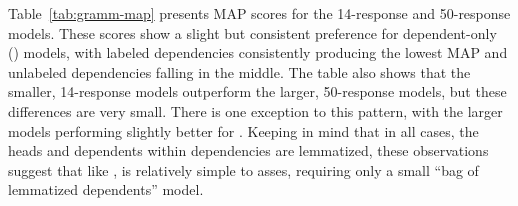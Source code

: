 Table~\ref{tab:gramm-map} presents  MAP scores for the 14-response and 50-response  models. These scores show a slight but consistent preference for dependent-only () models, with labeled dependencies consistently producing the lowest MAP and unlabeled dependencies falling in the middle. The table also shows that the smaller, 14-response models outperform the larger, 50-response models, but these differences are very small. There is one exception to this pattern, with the larger models performing slightly better for . Keeping in mind that in all cases, the heads and dependents within dependencies are lemmatized, these observations suggest that like ,  is relatively simple to asses, requiring only a small ``bag of lemmatized dependents'' model.


